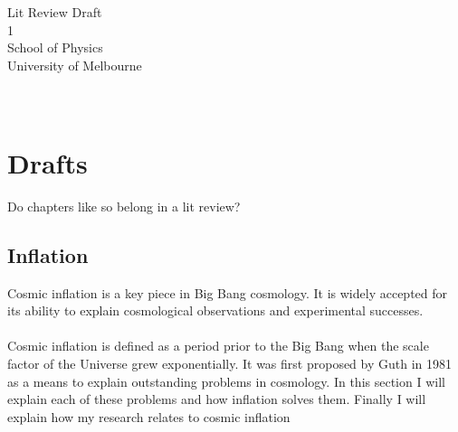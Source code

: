 \documentclass[12pt]{report}
\begin{document}
\thispagestyle{empty}
\begin{center}
\vspace{1cm}
\Huge{}\\
\vspace{2cm}
\Large{}\\
\vspace{2cm} %
\large{
Lit Review Draft\\
1}\\
\vspace{1cm}
\Large{School of Physics}\\
\large{University of Melbourne}\\
\vspace{.5cm}
\vspace{1cm}
\Large{}\\
\vspace{1.cm}
\normalsize
\\
\end{center}

\tableofcontents

\newpage

\vspace*{\fill}
\section*{}


\section*{}
\vspace*{\fill}
\chapter{Drafts}
Do chapters like so belong in a lit review?
\section{Inflation}
Cosmic inflation is a key piece in Big Bang cosmology. It is widely accepted for its ability to explain cosmological observations and experimental successes.
\\\\
Cosmic inflation is defined as a period prior to the Big Bang when the scale factor of the Universe grew exponentially. It was first proposed by Guth in 1981 as a means to explain outstanding problems in cosmology. In this section I will explain each of these problems and how inflation solves them. Finally I will explain how my research relates to cosmic inflation
\end{document}
